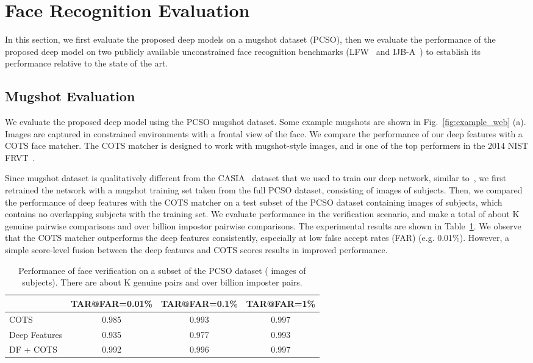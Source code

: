 \documentclass[10pt,journal,compsoc]{IEEEtran}
\begin{document}
\section{Face Recognition Evaluation}
In this section, we first evaluate the proposed deep models on a mugshot dataset (PCSO), then we evaluate the performance of the proposed deep model on two publicly available unconstrained face recognition benchmarks (LFW~\cite{DB:LFWTech} and IJB-A~\cite{db:janus}) to establish its performance relative to the state of the art.

\subsection{Mugshot Evaluation}
We evaluate the proposed deep model using the PCSO mugshot dataset. Some example mugshots are shown in Fig.~\ref{fig:example_web} (a). Images are captured in constrained environments with a frontal view of the face. We compare the performance of our deep features with a COTS face matcher. The COTS matcher is designed to work with mugshot-style images, and is one of the top performers in the 2014 NIST FRVT~\cite{fvrt:2014}.

Since mugshot dataset is qualitatively different from the CASIA~\cite{db:janus} dataset that we used to train our deep network, similar to~\cite{icb2015}, we first retrained the network with a mugshot training set taken from the full PCSO dataset, consisting of  images of  subjects. Then, we compared the performance of deep features with the COTS matcher on a test subset of the PCSO dataset containing  images of  subjects, which contains no overlapping subjects with the training set. We evaluate performance in the verification scenario, and make a total of about K genuine pairwise comparisons and over  billion impostor pairwise comparisons. The experimental results are shown in Table~\ref{tab:pcso}. We observe that the COTS matcher outperforms the deep features consistently, especially at low false accept rates (FAR) (e.g. 0.01\%). However, a simple score-level fusion between the deep features and COTS scores results in improved performance.

\begin{table}[htbp]
\scriptsize
\centering
\caption{Performance of face verification on a subset of the PCSO dataset ( images of  subjects). There are about K genuine pairs and over  billion imposter pairs.}\label{tab:pcso}
\begin{tabular}{l|ccc}
\toprule
              & TAR@FAR=0.01\% & TAR@FAR=0.1\% & TAR@FAR=1\%\\ \midrule
COTS          & 0.985    & 0.993     & 0.997 \\
Deep Features & 0.935    & 0.977     & 0.993 \\ \cmidrule{1-1}
DF + COTS     & 0.992    & 0.996     & 0.997 \\
\bottomrule
\end{tabular}
\end{table}
\end{document}
